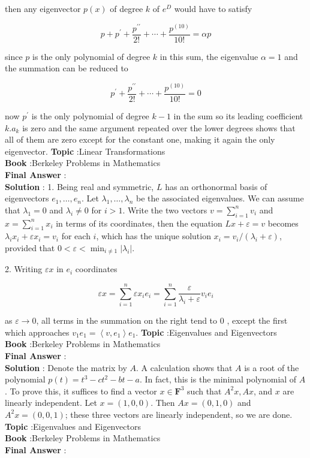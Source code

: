 \documentclass[10pt]{article}
\begin{document}
then any eigenvector $p(x)$ of degree $k$ of $e^{D}$ would have to satisfy

$$
p+p^{\prime}+\frac{p^{\prime \prime}}{2 !}+\cdots+\frac{p^{(10)}}{10 !}=\alpha p
$$

since $p$ is the only polynomial of degree $k$ in this sum, the eigenvalue $\alpha=1$ and the summation can be reduced to

$$
p^{\prime}+\frac{p^{\prime \prime}}{2 !}+\cdots+\frac{p^{(10)}}{10 !}=0
$$

now $p^{\prime}$ is the only polynomial of degree $k-1$ in the sum so its leading coefficient $k . a_{k}$ is zero and the same argument repeated over the lower degrees shows that all of them are zero except for the constant one, making it again the only eigenvector.
\textbf{Topic} :Linear Transformations \\
\textbf{Book} :Berkeley Problems in Mathematics\\
\textbf{Final Answer} :\\


\textbf{Solution} : 1. Being real and symmetric, $L$ has an orthonormal basis of eigenvectors $e_{1}, \ldots, e_{n}$. Let $\lambda_{1}, \ldots, \lambda_{n}$ be the associated eigenvalues. We can assume that $\lambda_{1}=0$ and $\lambda_{i} \neq 0$ for $i>1$. Write the two vectors $v=\sum_{i=1}^{n} v_{i}$ and $x=\sum_{i=1}^{n} x_{i}$ in terms of its coordinates, then the equation $L x+\varepsilon=v$ becomes $\lambda_{i} x_{i}+\varepsilon x_{i}=v_{i}$ for each $i$, which has the unique solution $x_{i}=v_{i} /\left(\lambda_{i}+\varepsilon\right)$, provided that $0<\varepsilon<\min _{i \neq 1}\left|\lambda_{i}\right|$.

2. Writing $\varepsilon x$ in $e_{i}$ coordinates

$$
\varepsilon x=\sum_{i=1}^{n} \varepsilon x_{i} e_{i}=\sum_{i=1}^{n} \frac{\varepsilon}{\lambda_{i}+\varepsilon} v_{i} e_{i}
$$

as $\varepsilon \rightarrow 0$, all terms in the summation on the right tend to 0 , except the first which approaches $v_{1} e_{1}=\left\langle v, e_{1}\right\rangle e_{1}$.
\textbf{Topic} :Eigenvalues and Eigenvectors \\
\textbf{Book} :Berkeley Problems in Mathematics\\
\textbf{Final Answer} :\\


\textbf{Solution} : Denote the matrix by $A$. A calculation shows that $A$ is a root of the polynomial $p(t)=t^{3}-c t^{2}-b t-a$. In fact, this is the minimal polynomial of $A$. To prove this, it suffices to find a vector $x \in \mathbf{F}^{3}$ such that $A^{2} x, A x$, and $x$ are linearly independent. Let $x=(1,0,0)$. Then $A x=(0,1,0)$ and $A^{2} x=(0,0,1)$; these three vectors are linearly independent, so we are done.
\textbf{Topic} :Eigenvalues and Eigenvectors \\
\textbf{Book} :Berkeley Problems in Mathematics\\
\textbf{Final Answer} :\\
\end{document}
